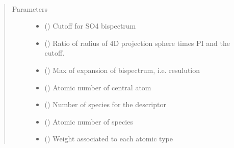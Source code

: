 \documentclass[letterpaper,10pt,english]{sphinxmanual}
\begin{document}
\begin{fulllineitems}
\label{\detokenize{descriptors:gap.descriptors.fourier_so4}}~\begin{quote}\begin{description}
\item[{Parameters}] \leavevmode\begin{itemize}
\item {} 
 () \textendash{} Cutoff for SO4 bispectrum

\item {} 
 () \textendash{} Ratio of radius of 4D projection sphere times PI and the cutoff.

\item {} 
 () \textendash{} Max of expansion of bispectrum, i.e. resulution

\item {} 
 () \textendash{} Atomic number of central atom

\item {} 
 () \textendash{} Number of species for the descriptor

\item {} 
 () \textendash{} Atomic number of species

\item {} 
 () \textendash{} Weight associated to each atomic type

\end{itemize}

\end{description}\end{quote}

\end{fulllineitems}
\end{document}
